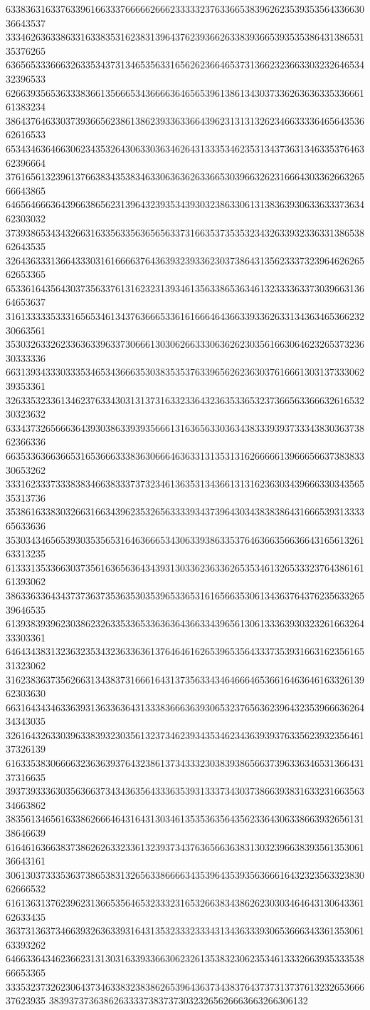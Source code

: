 63383631633763396166333766666266623333323763366538396262353935356433663036643537
33346263633863316338353162383139643762393662633839366539353538643138653135376265
63656533366632633534373134653563316562623664653731366232366330323264653432396533
62663935653633383661356665343666636465653961386134303733626363633533666161383234
38643764633037393665623861386239336336643962313131326234663333646564353662616533
65343463646630623435326430633036346264313335346235313437363134633537646362396664
37616561323961376638343538346330636362633665303966326231666430336266326566643865
64656466636439663865623139643239353439303238633061313836393063363337363462303032
37393865343432663163356335636565633731663537353532343263393233633138653862643535
32643633313664333031616666376436393239336230373864313562333732396462626562653365
65336164356430373563376131623231393461356338653634613233336337303966313664653637
31613333353331656534613437636665336161666464366339336263313436346536623230663561
35303263326233636339633730666130306266333063626230356166306462326537323630333336
66313934333033353465343666353038353537633965626236303761666130313733306239353361
32633532336134623763343031313731633233643236353365323736656336663261653230323632
63343732656663643930386339393566613163656330363438333939373334383036373862366336
66353363663665316536663338363066646363313135313162666661396665663738383330653262
33316233373338383466383337373234613635313436613131623630343966633034356535313736
35386163383032663166343962353265633339343739643034383838643166653931333365633636
35303434656539303535653164636665343063393863353764636635663664316561326163313235
61333135336630373561636563643439313033623633626535346132653332376438616161393062
38633633643437373637353635303539653365316165663530613436376437623563326539646535
61393839396230386232633533653363636436633439656130613336393032326166326433303361
64643438313236323534323633636137646461626539653564333735393166316235616531323062
31623836373562663134383731666164313735633434646664653661646364616332613962303630
66316434346336393136336364313338366636393065323765636239643235396663626434343035
32616432633039633839323035613237346239343534623436393937633562393235646137326139
61633538306666323636393764323861373433323038393865663739633634653136643137316635
39373933363035636637343436356433363539313337343037386639383163323166356334663862
38356134656163386266646431643130346135353635643562336430633866393265613138646639
61646163663837386262633233613239373437636566363831303239663839356135306136643161
30613037333536373865383132656338666634353964353935636661643232356332383062666532
61613631376239623136653564653233323165326638343862623030346464313064336162633435
36373136373466393263633931643135323332333431343633393065366634336135306163393262
64663364346236623131303163393366306232613538323062353461333266393533353866653365
33353237326230643734633832383862653964363734383764373731373761323265366637623935
3839373736386263333738373730323265626663663266306132
